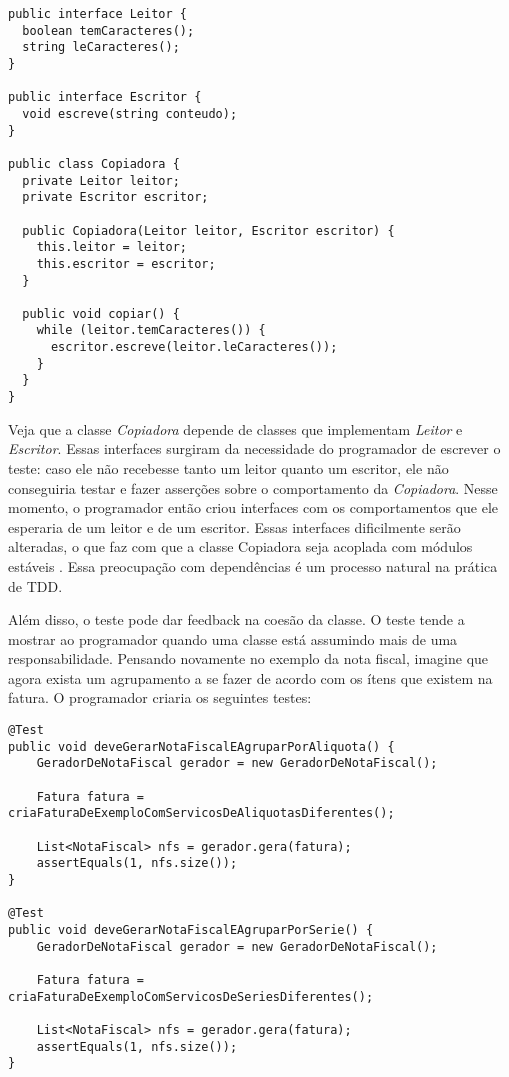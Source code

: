 \begin{lstlisting}[frame=trbl]
public interface Leitor {
  boolean temCaracteres();
  string leCaracteres();
}

public interface Escritor {
  void escreve(string conteudo);
}

public class Copiadora {
  private Leitor leitor;
  private Escritor escritor;

  public Copiadora(Leitor leitor, Escritor escritor) {
    this.leitor = leitor;
    this.escritor = escritor;
  }

  public void copiar() {
    while (leitor.temCaracteres()) {
      escritor.escreve(leitor.leCaracteres());
    }
  }
}
\end{lstlisting}

Veja que a classe \textit{Copiadora} depende de classes que implementam \textit{Leitor} e \textit{Escritor}. Essas interfaces
surgiram da necessidade do programador de escrever o teste: caso ele não recebesse tanto um leitor quanto um escritor, ele não
conseguiria testar e fazer asserções sobre o comportamento da \textit{Copiadora}. Nesse momento, o programador então criou interfaces
com os comportamentos que ele esperaria de um leitor e de um escritor. Essas interfaces dificilmente serão alteradas, o que faz com que
a classe Copiadora seja acoplada com módulos estáveis \cite{bob-martin}. Essa preocupação com dependências é um processo natural na prática de TDD.

Além disso, o teste pode dar feedback na coesão da classe. O teste tende a mostrar ao programador quando uma classe está assumindo mais
de uma responsabilidade. Pensando novamente no exemplo da nota fiscal, imagine que agora exista um agrupamento a se fazer de acordo com os 
ítens que existem na fatura. O programador criaria os seguintes testes:

\begin{lstlisting}[frame=trbl]
@Test
public void deveGerarNotaFiscalEAgruparPorAliquota() {
	GeradorDeNotaFiscal gerador = new GeradorDeNotaFiscal();
	
	Fatura fatura = criaFaturaDeExemploComServicosDeAliquotasDiferentes();
	
	List<NotaFiscal> nfs = gerador.gera(fatura);
	assertEquals(1, nfs.size());
}

@Test
public void deveGerarNotaFiscalEAgruparPorSerie() {
	GeradorDeNotaFiscal gerador = new GeradorDeNotaFiscal();
	
	Fatura fatura = criaFaturaDeExemploComServicosDeSeriesDiferentes();
	
	List<NotaFiscal> nfs = gerador.gera(fatura);
	assertEquals(1, nfs.size());
}
\end{lstlisting}


